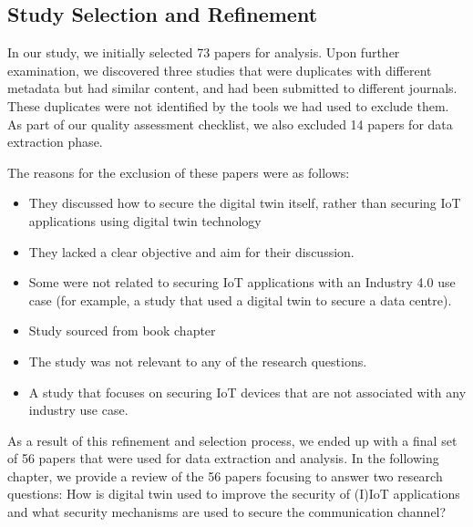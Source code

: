 \subsection{Study Selection and Refinement}

In our study, we initially selected 73 papers for analysis. Upon further examination, we discovered three studies that were duplicates with different metadata but had similar content, and had been submitted to different journals. These duplicates were not identified by the tools we had used to exclude them. As part of our quality assessment checklist, we also excluded 14 papers for data extraction phase.

The reasons for the exclusion of these papers were as follows:

\begin{itemize}
    \item They discussed how to secure the digital twin itself, rather than securing IoT applications using digital twin technology
    \item They lacked a clear objective and aim for their discussion.
    \item Some were not related to securing IoT applications with an Industry 4.0 use case (for example, a study that used a digital twin to secure a data centre).
    \item Study sourced from book chapter 
    \item The study was not relevant to any of the research questions.
    \item A study that focuses on securing IoT devices that are not associated with any industry use case. 
\end{itemize}

As a result of this refinement and selection process, we ended up with a final set of 56 papers that were used for data extraction and analysis. In the following chapter, we provide a review of the 56 papers focusing to answer two research questions: How is digital twin used to improve the security of (I)IoT applications and what security mechanisms are used to secure the communication channel?    




